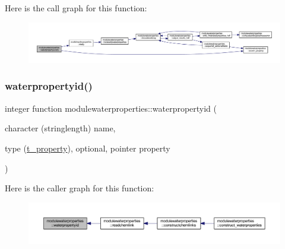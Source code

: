 Here is the call graph for this function\+:\nopagebreak
\begin{figure}[H]
\begin{center}
\leavevmode
\includegraphics[width=350pt]{namespacemodulewaterproperties_a2c7278a1e0767b9b9c5419a5b34299f5_cgraph}
\end{center}
\end{figure}
\mbox{\label{namespacemodulewaterproperties_a628b8ae42fe46f1e958582529ab79db4}} 
\subsubsection{\texorpdfstring{waterpropertyid()}{waterpropertyid()}}
{\footnotesize\ttfamily integer function modulewaterproperties\+::waterpropertyid (\begin{DoxyParamCaption}\item[{character (stringlength)}]{name,  }\item[{type (\mbox{\hyperlink{structmodulewaterproperties_1_1t__property}{t\+\_\+property}}), optional, pointer}]{property }\end{DoxyParamCaption})\hspace{0.3cm}{\ttfamily [private]}}

Here is the caller graph for this function\+:\nopagebreak
\begin{figure}[H]
\begin{center}
\leavevmode
\includegraphics[width=350pt]{namespacemodulewaterproperties_a628b8ae42fe46f1e958582529ab79db4_icgraph}
\end{center}
\end{figure}
\mbox{\label{namespacemodulewaterproperties_a330fc5f39079fff0948cbca492cf139a}} 
